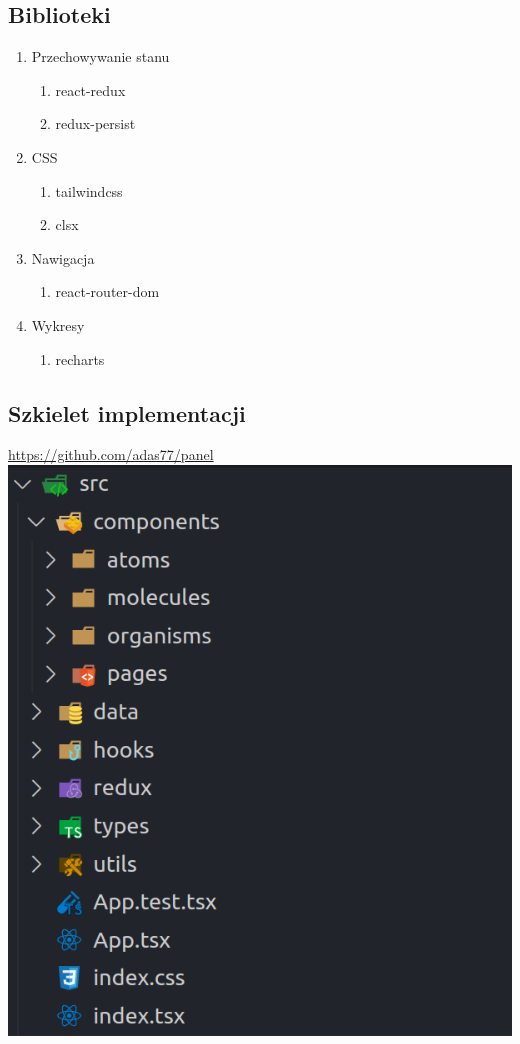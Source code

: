 \documentclass[a4paper,11pt]{article}
\begin{document}
\subsection{Biblioteki}
\begin{enumerate}
    \item Przechowywanie stanu
    \begin{enumerate}
        \item react-redux
        \item redux-persist
    \end{enumerate}
    \item CSS
    \begin{enumerate}
        \item tailwindcss
        \item clsx
    \end{enumerate}
    \item Nawigacja
    \begin{enumerate}
        \item react-router-dom
    \end{enumerate}
    \item Wykresy
    \begin{enumerate}
        \item recharts
    \end{enumerate}
\end{enumerate}
\subsection{Szkielet implementacji}
\url{https://github.com/adas77/panel} \\
\includegraphics[scale=0.5]{src/s.png}

% 
\end{document}
